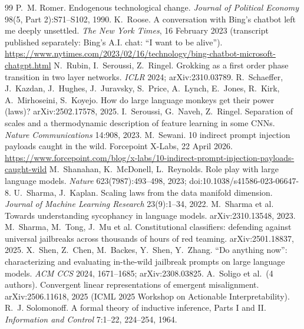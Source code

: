\begin{thebibliography}{99}
 P.~M. Romer. Endogenous technological change. \emph{Journal of Political Economy} 98(5, Part 2):S71--S102, 1990.
 K.~Roose. A conversation with Bing's chatbot left me deeply unsettled. \emph{The New York Times}, 16 February 2023 (transcript published separately: Bing's A.I. chat: ``I want to be alive''). \url{https://www.nytimes.com/2023/02/16/technology/bing-chatbot-microsoft-chatgpt.html}
 N.~Rubin, I.~Seroussi, Z.~Ringel. Grokking as a first order phase transition in two layer networks. \emph{ICLR} 2024; arXiv:2310.03789.
 R.~Schaeffer, J.~Kazdan, J.~Hughes, J.~Juravsky, S.~Price, A.~Lynch, E.~Jones, R.~Kirk, A.~Mirhoseini, S.~Koyejo. How do large language monkeys get their power (laws)? arXiv:2502.17578, 2025.
 I.~Seroussi, G.~Naveh, Z.~Ringel. Separation of scales and a thermodynamic description of feature learning in some CNNs. \emph{Nature Communications} 14:908, 2023.
 M.~Sewani. 10 indirect prompt injection payloads caught in the wild. Forcepoint X-Labs, 22 April 2026. \url{https://www.forcepoint.com/blog/x-labs/10-indirect-prompt-injection-payloads-caught-wild}
 M.~Shanahan, K.~McDonell, L.~Reynolds. Role play with large language models. \emph{Nature} 623(7987):493--498, 2023; doi:10.1038/s41586-023-06647-8.
 U.~Sharma, J.~Kaplan. Scaling laws from the data manifold dimension. \emph{Journal of Machine Learning Research} 23(9):1--34, 2022.
 M.~Sharma et al. Towards understanding sycophancy in language models. arXiv:2310.13548, 2023.
 M.~Sharma, M.~Tong, J.~Mu et al. Constitutional classifiers: defending against universal jailbreaks across thousands of hours of red teaming. arXiv:2501.18837, 2025.
 X.~Shen, Z.~Chen, M.~Backes, Y.~Shen, Y.~Zhang. ``Do anything now'': characterizing and evaluating in-the-wild jailbreak prompts on large language models. \emph{ACM CCS} 2024, 1671--1685; arXiv:2308.03825.
 A.~Soligo et al.\ (4 authors). Convergent linear representations of emergent misalignment. arXiv:2506.11618, 2025 (ICML 2025 Workshop on Actionable Interpretability).
 R.~J. Solomonoff. A formal theory of inductive inference, Parts I and II. \emph{Information and Control} 7:1--22, 224--254, 1964.

\end{thebibliography}
